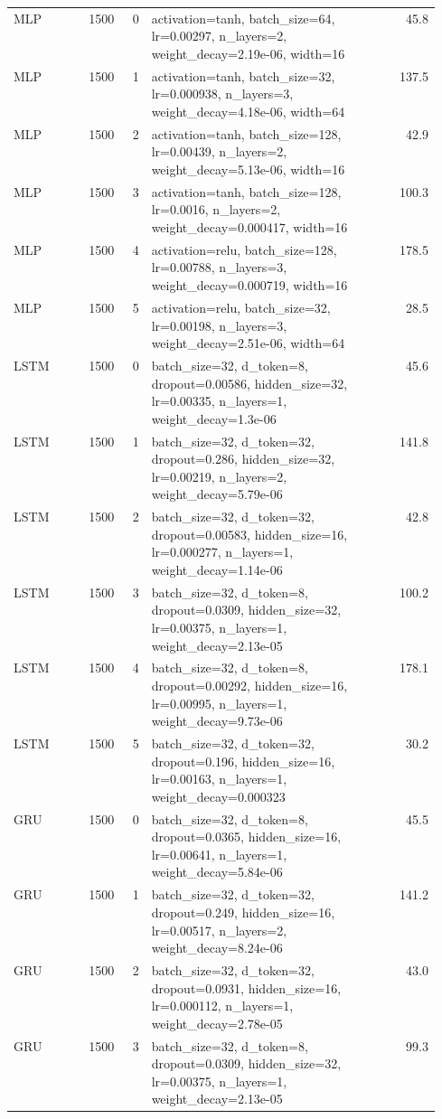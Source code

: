 \begin{longtable}{lrrp{0.55\linewidth}r}
MLP & 1500 & 0 & activation=tanh, batch\_size=64, lr=0.00297, n\_layers=2, weight\_decay=2.19e-06, width=16 & 45.8 \\
MLP & 1500 & 1 & activation=tanh, batch\_size=32, lr=0.000938, n\_layers=3, weight\_decay=4.18e-06, width=64 & 137.5 \\
MLP & 1500 & 2 & activation=tanh, batch\_size=128, lr=0.00439, n\_layers=2, weight\_decay=5.13e-06, width=16 & 42.9 \\
MLP & 1500 & 3 & activation=tanh, batch\_size=128, lr=0.0016, n\_layers=2, weight\_decay=0.000417, width=16 & 100.3 \\
MLP & 1500 & 4 & activation=relu, batch\_size=128, lr=0.00788, n\_layers=3, weight\_decay=0.000719, width=16 & 178.5 \\
MLP & 1500 & 5 & activation=relu, batch\_size=32, lr=0.00198, n\_layers=3, weight\_decay=2.51e-06, width=64 & 28.5 \\
LSTM & 1500 & 0 & batch\_size=32, d\_token=8, dropout=0.00586, hidden\_size=32, lr=0.00335, n\_layers=1, weight\_decay=1.3e-06 & 45.6 \\
LSTM & 1500 & 1 & batch\_size=32, d\_token=32, dropout=0.286, hidden\_size=32, lr=0.00219, n\_layers=2, weight\_decay=5.79e-06 & 141.8 \\
LSTM & 1500 & 2 & batch\_size=32, d\_token=32, dropout=0.00583, hidden\_size=16, lr=0.000277, n\_layers=1, weight\_decay=1.14e-06 & 42.8 \\
LSTM & 1500 & 3 & batch\_size=32, d\_token=8, dropout=0.0309, hidden\_size=32, lr=0.00375, n\_layers=1, weight\_decay=2.13e-05 & 100.2 \\
LSTM & 1500 & 4 & batch\_size=32, d\_token=8, dropout=0.00292, hidden\_size=16, lr=0.00995, n\_layers=1, weight\_decay=9.73e-06 & 178.1 \\
LSTM & 1500 & 5 & batch\_size=32, d\_token=32, dropout=0.196, hidden\_size=16, lr=0.00163, n\_layers=1, weight\_decay=0.000323 & 30.2 \\
GRU & 1500 & 0 & batch\_size=32, d\_token=8, dropout=0.0365, hidden\_size=16, lr=0.00641, n\_layers=1, weight\_decay=5.84e-06 & 45.5 \\
GRU & 1500 & 1 & batch\_size=32, d\_token=32, dropout=0.249, hidden\_size=16, lr=0.00517, n\_layers=2, weight\_decay=8.24e-06 & 141.2 \\
GRU & 1500 & 2 & batch\_size=32, d\_token=32, dropout=0.0931, hidden\_size=16, lr=0.000112, n\_layers=1, weight\_decay=2.78e-05 & 43.0 \\
GRU & 1500 & 3 & batch\_size=32, d\_token=8, dropout=0.0309, hidden\_size=32, lr=0.00375, n\_layers=1, weight\_decay=2.13e-05 & 99.3 \\

\end{longtable}
